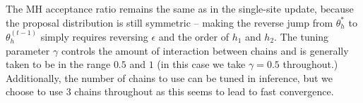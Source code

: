 The MH acceptance ratio remains the same as in the single-site update, because the proposal distribution is still symmetric -- making the reverse jump from $\theta_h^*$ to $\theta_h^{(t-1)}$ simply requires reversing $\epsilon$ and the order of $h_1$ and $h_2$. The tuning parameter $\gamma$ controls the amount of interaction between chains and is generally taken to be in the range $0.5$ and $1$ (in this case we take $\gamma = 0.5$ throughout.) Additionally, the number of chains to use can be tuned in inference, but we choose to use $3$ chains throughout as this seems to lead to fast convergence.

